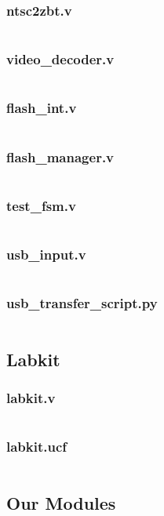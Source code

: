 \documentclass{article}
\begin{document}
\subsubsection{ntsc2zbt.v}
\inputminted[linenos]{verilog}{../../src/ntsc2zbt.v}
\subsubsection{video\_decoder.v}
\inputminted[linenos]{verilog}{../../src/video_decoder.v}
\subsubsection{flash\_int.v}
\inputminted[linenos]{verilog}{../../assets/flash_IO/flash_int.v}
\subsubsection{flash\_manager.v}
\inputminted[linenos]{verilog}{../../assets/flash_IO/flash_manager.v}
\subsubsection{test\_fsm.v}
\inputminted[linenos]{verilog}{../../assets/flash_IO/test_fsm.v}
\subsubsection{usb\_input.v}
\inputminted[linenos]{verilog}{../../assets/USB_Transfer/usb_input.v}
\subsubsection{usb\_transfer\_script.py}
\inputminted[linenos]{python}{../../assets/usb_transfer_script.py}


\subsection{Labkit}
\subsubsection{labkit.v}
\inputminted[linenos]{verilog}{../../src/labkit.v}
\subsubsection{labkit.ucf}
\inputminted[linenos]{verilog}{../../src/labkit.ucf}

\subsection{Our Modules}
\end{document}

